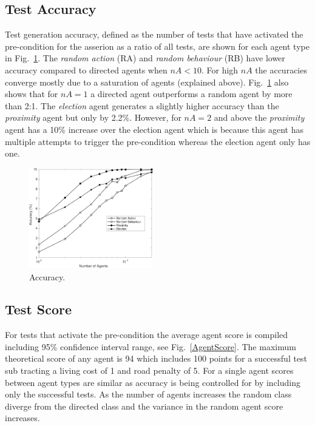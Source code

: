 \documentclass[letterpaper, 10 pt, journal, twoside]{IEEEtran}
\begin{document}
\subsection{Test Accuracy}
Test generation accuracy, defined as the number of tests that have activated the pre-condition for the asserion as a ratio of all tests, are shown for each agent type in Fig.~\ref{Accuracy}. The \textit{random action} (RA) and \textit{random behaviour} (RB) have lower accuracy compared to directed agents when $nA<10$. For high $nA$ the accuracies converge mostly due to a saturation of agents (explained above).
%
Fig.~\ref{Accuracy} also shows that for $nA=1$ a directed agent outperforms a random agent by more than 2:1. The \textit{election} agent generates a slightly higher accuracy than the \textit{proximity} agent but only by 2.2\%. However, for $nA=2$ and above the \textit{proximity} agent has a 10\% increase over the election agent which is because this agent has multiple attempts to trigger the pre-condition whereas the election agent only has one.


\begin{figure}[!t]
	\centering
\includegraphics[width=0.48\textwidth]{Accuracy.pdf}
	\caption{Accuracy.}
	\label{Accuracy}
\end{figure}



\subsection{Test Score}
For tests that activate the pre-condition the average agent score is compiled including 95\% confidence interval range, see Fig.~\ref{AgentScore}. The maximum theoretical score of any agent is 94 which includes 100 points for a successful test sub tracting a living cost of 1 and road penalty of 5. For a single agent scores between agent types are similar as accuracy is being controlled for by including only the successful tests. As the number of agents increases the random class diverge from the directed class and the variance in the random agent score increases. 
\end{document}

